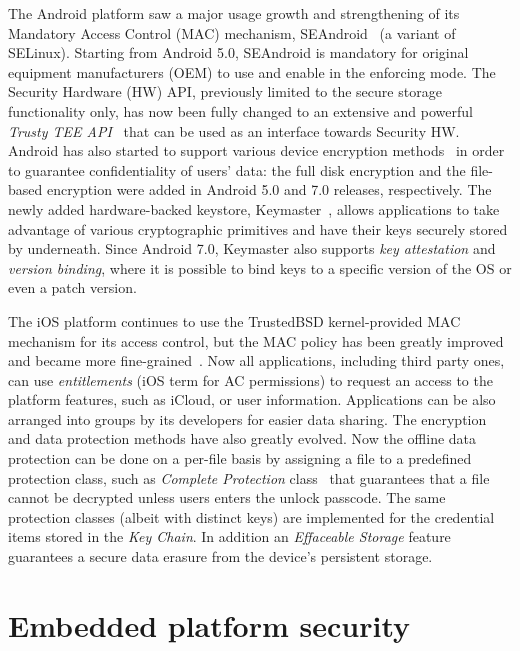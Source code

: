 The Android platform saw a major usage growth and strengthening of its Mandatory Access Control (MAC) mechanism, SEAndroid~\cite{smalley12} (a variant of SELinux). Starting from Android 5.0, SEAndroid is mandatory for original equipment manufacturers (OEM) to use and enable in the enforcing mode. The Security Hardware (HW) API, previously limited to the secure storage functionality only, has now been fully changed to an extensive and powerful \textit{Trusty TEE API}~\cite{trusty} that can be used as an interface towards Security HW. Android has also started to support various device encryption methods~\cite{androidencr} in order to guarantee confidentiality of users' data: the full disk encryption and the file-based encryption were added in Android 5.0 and 7.0 releases, respectively. The newly added hardware-backed keystore, Keymaster~\cite{androidkeymaster}, allows applications to take advantage of various cryptographic primitives and have their keys securely stored by underneath. Since Android 7.0, Keymaster also supports \textit{key attestation} and \textit{version binding}, where it is possible to bind keys to a specific version of the OS or even a patch version. 

The iOS platform continues to use the TrustedBSD kernel-provided MAC mechanism for its access control, but the MAC policy has been greatly improved and became more fine-grained~\cite{iOS11}.  Now all applications, including third party ones, can use \textit{entitlements} (iOS term for AC permissions) to request an access to the platform features, such as iCloud, or user information. Applications can be also arranged into groups by its developers for easier data sharing. The encryption and data protection methods have also greatly evolved. Now the offline data protection can be done on a per-file basis by assigning a file to a predefined protection class, such as \textit{Complete Protection} class~\cite{iOS11} that guarantees that a file cannot be decrypted unless users enters the unlock passcode. The same protection classes (albeit with distinct keys) are implemented for the credential items stored in the \textit{Key Chain}. In addition an \textit{Effaceable Storage} feature~\cite{iOS11} guarantees a secure data erasure from the device's persistent storage. 

\section{Embedded platform security}

